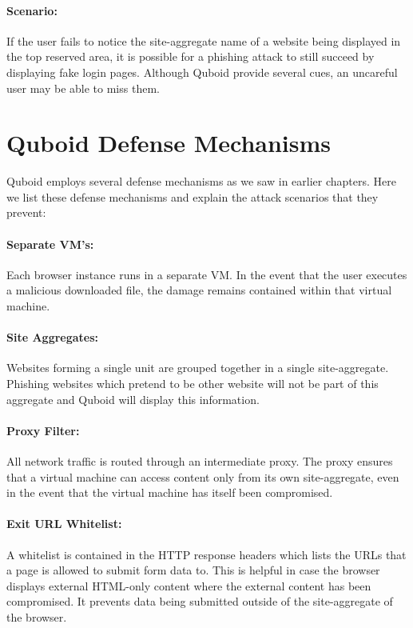 \paragraph{Scenario:} If the user fails to notice the site-aggregate name of a website being displayed in the top reserved area, it is possible for a phishing attack to still succeed by displaying fake login pages. Although Quboid provide several cues, an uncareful user may be able to miss them.

\section{Quboid Defense Mechanisms}

Quboid employs several defense mechanisms as we saw in earlier chapters. Here we list these defense mechanisms and explain the attack scenarios that they prevent:

\paragraph{Separate VM's:} Each browser instance runs in a separate VM. In the event that the user executes a malicious downloaded file, the damage remains contained within that virtual machine.

\paragraph{Site Aggregates:} Websites forming a single unit are grouped together in a single site-aggregate. Phishing websites which pretend to be other website will not be part of this aggregate and Quboid will display this information.

\paragraph{Proxy Filter:} All network traffic is routed through an intermediate proxy. The proxy ensures that a virtual machine can access content only from its own site-aggregate, even in the event that the virtual machine has itself been compromised.

\paragraph{Exit URL Whitelist:} A whitelist is contained in the HTTP response headers which lists the URLs that a page is allowed to submit form data to. This is helpful in case the browser displays external HTML-only content where the external content has been compromised. It prevents data being submitted outside of the site-aggregate of the browser.

